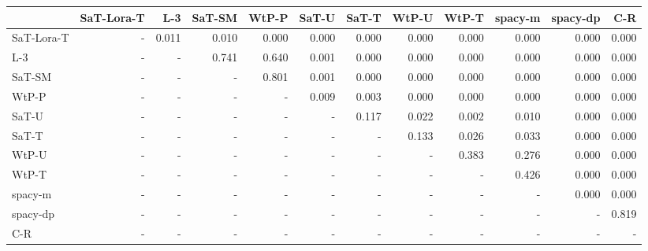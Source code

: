 \begin{tabular}{lrrrrrrrrrrr}
\toprule
 & SaT-Lora-T & L-3 & SaT-SM & WtP-P & SaT-U & SaT-T & WtP-U & WtP-T & spacy-m & spacy-dp & C-R \\
\midrule
SaT-Lora-T & - & 0.011 & 0.010 & 0.000 & 0.000 & 0.000 & 0.000 & 0.000 & 0.000 & 0.000 & 0.000 \\
L-3 & - & - & 0.741 & 0.640 & 0.001 & 0.000 & 0.000 & 0.000 & 0.000 & 0.000 & 0.000 \\
SaT-SM & - & - & - & 0.801 & 0.001 & 0.000 & 0.000 & 0.000 & 0.000 & 0.000 & 0.000 \\
WtP-P & - & - & - & - & 0.009 & 0.003 & 0.000 & 0.000 & 0.000 & 0.000 & 0.000 \\
SaT-U & - & - & - & - & - & 0.117 & 0.022 & 0.002 & 0.010 & 0.000 & 0.000 \\
SaT-T & - & - & - & - & - & - & 0.133 & 0.026 & 0.033 & 0.000 & 0.000 \\
WtP-U & - & - & - & - & - & - & - & 0.383 & 0.276 & 0.000 & 0.000 \\
WtP-T & - & - & - & - & - & - & - & - & 0.426 & 0.000 & 0.000 \\
spacy-m & - & - & - & - & - & - & - & - & - & 0.000 & 0.000 \\
spacy-dp & - & - & - & - & - & - & - & - & - & - & 0.819 \\
C-R & - & - & - & - & - & - & - & - & - & - & - \\
\bottomrule
\end{tabular}

